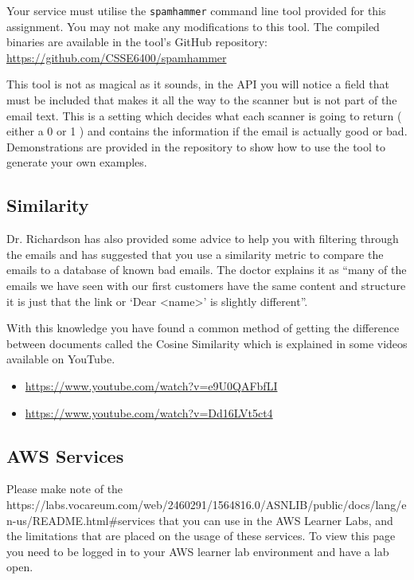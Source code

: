\documentclass{csse4400}
\begin{document}

Your service must utilise the \texttt{spamhammer} command line tool provided for this assignment. You may not make any modifications to this tool. The compiled binaries are available in the tool's GitHub repository: \url{https://github.com/CSSE6400/spamhammer}

This tool is not as magical as it sounds, in the API you will notice a field that must be included that makes it all the way to the scanner but is not part of the email text. This is a setting which decides what each scanner is going to return ( either a 0 or 1 ) and contains the information if the email is actually good or bad. Demonstrations are provided in the repository to show how to use the tool to generate your own examples.

\subsection{Similarity}

Dr. Richardson has also provided some advice to help you with filtering through the emails and has suggested that you use a similarity metric to compare the emails to a database of known bad emails. The doctor explains it as ``many of the emails we have seen with our first customers have the same content and structure it is just that the link or `Dear <name>' is slightly different''.

With this knowledge you have found a common method of getting the difference between documents called the Cosine Similarity which is explained in some videos available on YouTube.

\begin{itemize}
  \item \url{https://www.youtube.com/watch?v=e9U0QAFbfLI}
  \item \url{https://www.youtube.com/watch?v=Dd16LVt5ct4}
\end{itemize}


\subsection{AWS Services}
Please make note of the 
{https://labs.vocareum.com/web/2460291/1564816.0/ASNLIB/public/docs/lang/en-us/README.html\#services}
that you can use in the AWS Learner Labs, and the limitations that are placed on the usage of these services.
To view this page you need to be logged in to your AWS learner lab environment and have a lab open.
\end{document}
